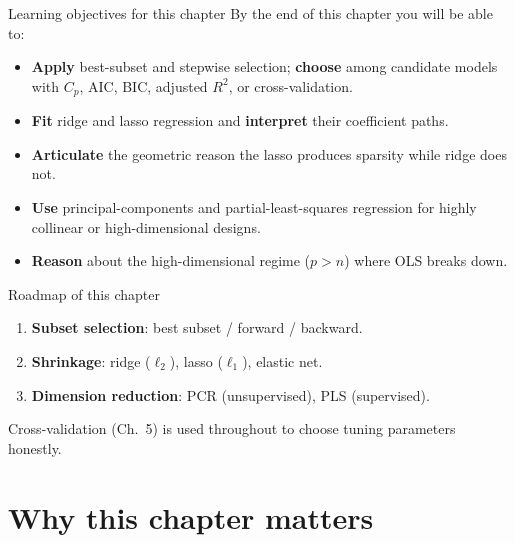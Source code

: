 \documentclass[aspectratio=169,11pt]{beamer}
\begin{document}
\begin{frame}{Learning objectives for this chapter}
  By the end of this chapter you will be able to:
  \begin{itemize}
    \item \textbf{Apply} best-subset and stepwise selection;
          \textbf{choose} among candidate models with $C_p$, AIC, BIC,
          adjusted $R^2$, or cross-validation.
    \item \textbf{Fit} ridge and lasso regression and \textbf{interpret}
          their coefficient paths.
    \item \textbf{Articulate} the geometric reason the lasso produces
          sparsity while ridge does not.
    \item \textbf{Use} principal-components and partial-least-squares
          regression for highly collinear or high-dimensional designs.
    \item \textbf{Reason} about the high-dimensional regime ($p > n$)
          where OLS breaks down.
  \end{itemize}
\end{frame}


\begin{frame}{Roadmap of this chapter}
  \begin{takeaway}
    \begin{enumerate}
      \item \textbf{Subset selection}: best subset / forward / backward.
      \item \textbf{Shrinkage}: ridge ($\ell_2$), lasso ($\ell_1$),
            elastic net.
      \item \textbf{Dimension reduction}: PCR (unsupervised), PLS
            (supervised).
    \end{enumerate}
  \end{takeaway}
  Cross-validation (Ch.~5) is used throughout to choose tuning
  parameters honestly.
\end{frame}

\section{Why this chapter matters}
\end{document}
